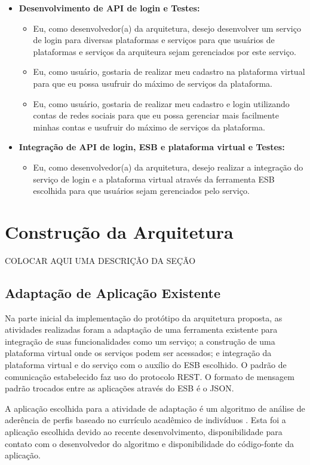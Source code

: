 \begin{itemize}
\item \textbf{Desenvolvimento de API de login e Testes:} 
\begin{itemize}
\item Eu, como desenvolvedor(a) da arquitetura, desejo desenvolver um serviço de login para diversas plataformas e serviços para que usuários de plataformas e serviços da arquiteura sejam gerenciados por este serviço.
\item Eu, como usuário, gostaria de realizar meu cadastro na plataforma virtual para que eu possa usufruir do máximo de serviços da plataforma.
\item Eu, como usuário, gostaria de realizar meu cadastro e login utilizando contas de redes sociais para que eu possa gerenciar mais facilmente minhas contas e usufruir do máximo de serviços da plataforma.
\end{itemize}

\item \textbf{Integração de API de login, ESB e plataforma virtual e Testes:} 
\begin{itemize}
\item Eu, como desenvolvedor(a) da arquitetura, desejo realizar a integração do serviço de login e a plataforma virtual através da ferramenta ESB escolhida para que usuários sejam gerenciados pelo serviço.
\end{itemize}

\end{itemize}


\section{Construção da Arquitetura}
COLOCAR AQUI UMA DESCRIÇÃO DA SEÇÃO

\subsection{Adaptação de Aplicação Existente}
Na parte inicial da implementação do protótipo da arquitetura proposta, as atividades realizadas foram a adaptação de uma ferramenta existente para integração de suas funcionalidades como um serviço; a construção de uma plataforma virtual onde os serviços podem ser acessados; e integração da plataforma virtual e do serviço com o auxílio do ESB escolhido. O padrão de comunicação estabelecido faz uso do protocolo REST. O formato de mensagem padrão trocados entre as aplicações através do ESB é o JSON.

A aplicação escolhida para a atividade de adaptação é um algoritmo de análise de aderência de perfis baseado no currículo acadêmico de indivíduos \cite{jesus_algoritmo_2014}. Esta foi a aplicação escolhida devido ao recente desenvolvimento, disponibilidade para contato com o desenvolvedor do algoritmo e disponibilidade do código-fonte da aplicação.

